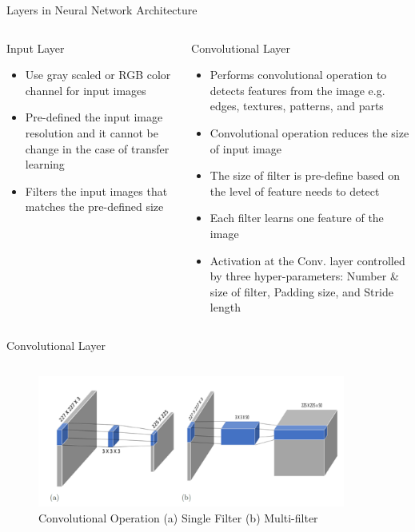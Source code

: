 \documentclass[10pt]{beamer}
\begin{document}
\begin{frame}{Layers in Neural Network Architecture}

\begin{columns}
    \begin{block}{Input Layer}
         \begin{itemize}
             \item Use gray scaled or RGB color channel for input images
             \item Pre-defined the input image resolution and it cannot be change in the case of transfer learning
             \item Filters the input images that matches the pre-defined size
         \end{itemize}
    \end{block}
    
    \begin{block}{Convolutional Layer}
         \begin{itemize}
             \item Performs convolutional operation to detects features from the image e.g. edges, textures, patterns, and parts
             \item Convolutional operation reduces the size of input image 
             \item The size of filter is pre-define based on the level of feature needs to detect
             \item Each filter learns one feature of the image
             \item Activation at the Conv. layer controlled by three hyper-parameters: Number \& size of filter, Padding size, and Stride length 
         \end{itemize}
    \end{block}  
\end{columns}
    
\end{frame}

\begin{frame}{Convolutional Layer}
    \begin{columns}
        \begin{example}
            \begin{figure}
                \centering
                \includegraphics[width = 0.9\textwidth]{Images/convoper.png}
                \caption{Convolutional Operation (a) Single Filter (b) Multi-filter}
            \end{figure}
        \end{example}
    \end{columns}
\end{frame}
\end{document}

